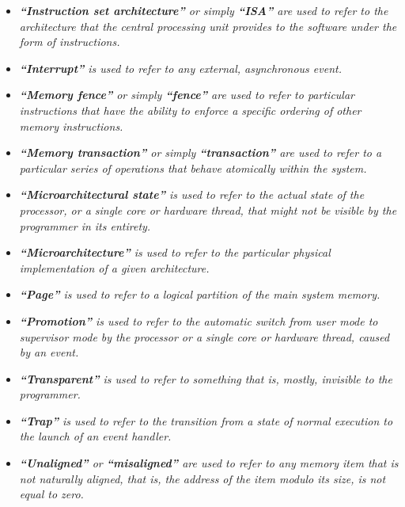 \documentclass{article}
\begin{document}
\begin{itemize}
                \item \textit{\textbf{``Instruction set architecture''} or simply \textbf{``ISA''} are used to refer to the architecture that the central processing unit provides to the software under the form of instructions.}

                \item \textit{\textbf{``Interrupt''} is used to refer to any external, asynchronous event.}

                \item \textit{\textbf{``Memory fence''} or simply \textbf{``fence''} are used to refer to particular instructions that have the ability to enforce a specific ordering of other memory instructions.}

                \item \textit{\textbf{``Memory transaction''} or simply \textbf{``transaction''} are used to refer to a particular series of operations that behave atomically within the system.}

                \item \textit{\textbf{``Microarchitectural state''} is used to refer to the actual state of the processor, or a single core or hardware thread, that might not be visible by the programmer in its entirety.}

                \item \textit{\textbf{``Microarchitecture''} is used to refer to the particular physical implementation of a given architecture.}

                \item \textit{\textbf{``Page''} is used to refer to a logical partition of the main system memory.}

                \item \textit{\textbf{``Promotion''} is used to refer to the automatic switch from user mode to supervisor mode by the processor or a single core or hardware thread, caused by an event.}

                \item \textit{\textbf{``Transparent''} is used to refer to something that is, mostly, invisible to the programmer.}

                \item \textit{\textbf{``Trap''} is used to refer to the transition from a state of normal execution to the launch of an event handler.}

                \item \textit{\textbf{``Unaligned''} or \textbf{``misaligned''} are used to refer to any memory item that is not naturally aligned, that is, the address of the item modulo its size, is not equal to zero.}

            \end{itemize}
\end{document}
